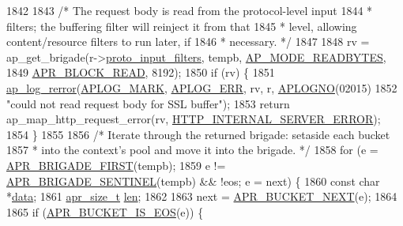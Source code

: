\begin{DoxyCode}
{1842 
1843         \textcolor{comment}{/* The request body is read from the protocol-level input}
1844 \textcolor{comment}{         * filters; the buffering filter will reinject it from that}
1845 \textcolor{comment}{         * level, allowing content/resource filters to run later, if}
1846 \textcolor{comment}{         * necessary. */}
1847 
1848         rv = ap\_get\_brigade(r->\hyperlink{structrequest__rec_af1d131cbf9a8564874b4196bff89121c}{proto\_input\_filters}, tempb, 
      \hyperlink{util__filter_8h_ab570898d09fbbe5b6d838e28b90134e0a2d8e63e1da380c3909ac0a1325339de4}{AP\_MODE\_READBYTES},
1849                             \hyperlink{group__APR__Util__Bucket__Brigades_gga756973fb6392bd1026c3d96b4519776da2d983f5b7fd996434e0dded171c261d8}{APR\_BLOCK\_READ}, 8192);
1850         \textcolor{keywordflow}{if} (rv) \{
1851             \hyperlink{group__APACHE__CORE__LOG_ga4c112558ccffd6b363da102b2052d2a6}{ap\_log\_rerror}(\hyperlink{group__APACHE__CORE__LOG_ga655e126996849bcb82e4e5a14c616f4a}{APLOG\_MARK}, \hyperlink{group__APACHE__CORE__LOG_ga57ad94ed8c92c4306de90479251a5d58}{APLOG\_ERR}, rv, r, 
      \hyperlink{group__APACHE__CORE__LOG_ga1dee8a07e06bc5b3de8b89662c2cd666}{APLOGNO}(02015)
1852                           \textcolor{stringliteral}{"could not read request body for SSL buffer"});
1853             \textcolor{keywordflow}{return} ap\_map\_http\_request\_error(rv, \hyperlink{group__HTTP__Status_ga5d9777e02c26063c2985e39ef71091d2}{HTTP\_INTERNAL\_SERVER\_ERROR});
1854         \}
1855 
1856         \textcolor{comment}{/* Iterate through the returned brigade: setaside each bucket}
1857 \textcolor{comment}{         * into the context's pool and move it into the brigade. */}
1858         \textcolor{keywordflow}{for} (e = \hyperlink{group__APR__Util__Bucket__Brigades_gab5826a11eb6ba90786a94282f806c230}{APR\_BRIGADE\_FIRST}(tempb);
1859              e != \hyperlink{group__APR__Util__Bucket__Brigades_ga858da66dccab1e063415678bb115788a}{APR\_BRIGADE\_SENTINEL}(tempb) && !eos; e = next) \{
1860             \textcolor{keyword}{const} \textcolor{keywordtype}{char} *\hyperlink{group__APACHE__CORE__LOG_gae4950db1dbfff8459a712737063b61aa}{data};
1861             \hyperlink{group__apr__platform_gaaa72b2253f6f3032cefea5712a27540e}{apr\_size\_t} \hyperlink{group__APACHE__CORE__LOG_gab5a43233d60ef05c5b5bf5cba3d74468}{len};
1862 
1863             next = \hyperlink{group__APR__Util__Bucket__Brigades_ga7171f690b203d548a5b6ae0b079068d8}{APR\_BUCKET\_NEXT}(e);
1864 
1865             \textcolor{keywordflow}{if} (\hyperlink{group__APR__Util__Bucket__Brigades_ga89b225e1c08473766eec719b985ca0d6}{APR\_BUCKET\_IS\_EOS}(e)) \{
}
\end{DoxyCode}
